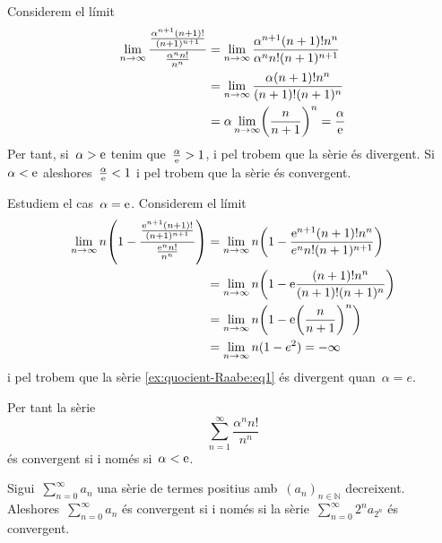 \documentclass[../analisi-matematica.tex]{subfiles}
\begin{document}
    \begin{solution}
        Considerem el límit
        \begin{align*}
            \lim_{n\to\infty}\frac{\frac{\alpha^{n+1}(n+1)!}{(n+1)^{n+1}}}{\frac{\alpha^{n}n!}{n^{n}}}&=\lim_{n\to\infty}\frac{\alpha^{n+1}(n+1)!n^{n}}{\alpha^{n}n!(n+1)^{n+1}} \\
            &=\lim_{n\to\infty}\frac{\alpha(n+1)!n^{n}}{(n+1)!(n+1)^{n}} \\
            &=\alpha\lim_{n\to\infty}\left(\frac{n}{n+1}\right)^{n}=\frac{\alpha}{\e} %
        \end{align*}
        Per tant, si~\(\alpha>\mathrm{e}\) tenim que~\(\frac{\alpha}{\mathrm{e}}>1\), i pel  trobem que la sèrie és divergent.
        Si~\(\alpha<\mathrm{e}\) aleshores~\(\frac{\alpha}{\mathrm{e}}<1\) i pel  trobem que la sèrie és convergent.

        Estudiem el cas~\(\alpha=\mathrm{e}\).
        Considerem el límit
        \begin{align*}
            \lim_{n\to\infty}n\left(1-\frac{\frac{\e^{n+1}(n+1)!}{(n+1)^{n+1}}}{\frac{\e^{n}n!}{n^{n}}}\right)&=\lim_{n\to\infty}n\left(1-\frac{\e^{n+1}(n+1)!n^{n}}{e^{n}n!(n+1)^{n+1}}\right) \\
            &=\lim_{n\to\infty}n\left(1-\e\frac{(n+1)!n^{n}}{(n+1)!(n+1)^{n}}\right) \\
            &=\lim_{n\to\infty}n\left(1-\e\left(\frac{n}{n+1}\right)^{n}\right) \\
            &=\lim_{n\to\infty}n(1-e^{2})=-\infty %
        \end{align*}
        i pel  trobem que la sèrie \eqref{ex:quocient-Raabe:eq1} és divergent quan~\(\alpha=e\).

        Per tant la sèrie
        \[
            \sum_{n=1}^{\infty}\frac{\alpha^{n}n!}{n^{n}}
        \]
        és convergent si i només si~\(\alpha<\mathrm{e}\).
    \end{solution}
    \begin{proposition}
        \label{prop:criteri-de-condensacio}
        Sigui~\(\sum_{n=0}^{\infty}a_{n}\) una sèrie de termes positius amb~\((a_{n})_{n\in\mathbb{N}}\) decreixent.
        Aleshores~\(\sum_{n=0}^{\infty}a_{n}\) és convergent si i només si la sèrie~\(\sum_{n=0}^{\infty}2^{n}a_{2^{n}}\) és convergent.
    \end{proposition}
\end{document}
